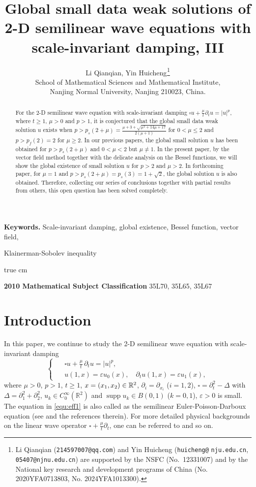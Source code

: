 \documentclass[11pt,twoside]{article}
\title{Global small data weak solutions of 2-D semilinear wave equations
with  scale-invariant  damping, III}
\author{Li Qianqian, \qquad Yin Huicheng$^{}$\footnote{Li Qianqian (\texttt{214597007@qq.com}) and Yin Huicheng
    (\texttt{huicheng@} \texttt{nju.edu.cn}, \texttt{05407@njnu.edu.cn}) are supported by the NSFC
    (No.~12331007) and by the National key research and development programs of China (No. 2020YFA0713803, No. 2024YFA1013300).}\vspace{0.5cm}\\
  \small School of Mathematical Sciences and Mathematical Institute,\\
\small Nanjing Normal University, Nanjing 210023, China.\\}
\newcommand{\R}{\mathbb R}
\newcommand{\p}{\partial}
\newcommand{\ve}{\varepsilon}
\newcommand{\f}{\frac}
\theoremstyle{plain}
\theoremstyle{definition}
\theoremstyle{remark}
\numberwithin{equation}{section}
\begin{document}
\date{}

\maketitle
\thispagestyle{empty}

\begin{abstract}
For the $2$-D semilinear wave equation with  scale-invariant  damping
$\square u+\f{\mu}{t}\p_tu=|u|^p$,
where $t\ge 1$, $\mu>0$ and $p>1$,  it is conjectured that  the
global small data weak solution $u$ exists when $p>p_{s}(2+\mu)
=\f{\mu+3+\sqrt{\mu^2+14\mu+17}}{2(\mu+1)}$ for  $0<\mu\le 2$ and $p>p_f(2)=2$ for $\mu\ge 2$. In our previous papers,
the global small solution $u$ has been obtained for $p>p_{s}(2+\mu)$
and $0<\mu<2$ but $\mu\not=1$. In the present paper, by the vector field method
together with the delicate analysis on the Bessel functions, we will show the global existence of small solution $u$ for
$p>2$ and $\mu>2$. In forthcoming paper, for $\mu=1$ and $p>p_{s}(2+\mu)=p_{s}(3)=1+\sqrt 2$,
the global solution $u$ is also obtained.
Therefore, collecting our series of conclusions together with partial results from others, this open question has been solved completely.
\end{abstract}

\noindent
\textbf{Keywords.} Scale-invariant damping,  global existence, Bessel function, vector field,

\qquad \quad Klainerman-Sobolev inequality

 true cm

\noindent
\textbf{2010 Mathematical Subject Classification} 35L70, 35L65, 35L67

\tableofcontents

\section{Introduction}
In this paper, we continue to study  the 2-D semilinear wave equation with scale-invariant  damping
\begin{equation}\label{equ:eff1}
\left\{ \enspace
\begin{aligned}
&\square u+\f{\mu}{t}\,\p_tu=|u|^p, \\
&u(1,x)=\ve u_0(x), \quad \partial_{t} u(1,x)=\ve u_1(x),
\end{aligned}
\right.
\end{equation}
where $\mu>0$,  $p>1$, $t\ge 1$, $x=(x_1, x_2)\in\Bbb R^2$,
$\p_i=\p_{x_i}$ ($i=1, 2$), $\square=\partial_t^2-\Delta$ with $\Delta=\p_1^2+\p_2^2$, $u_k\in
C_0^{\infty}(\R^2)$ and $\operatorname{supp} u_k\in B(0, 1)$  ($k=0, 1$), $\ve>0$ is small.
The equation in \eqref{equ:eff1} is also called as the semilinear Euler-Poisson-Darboux equation (see \cite{DA-0}
and the references therein). For  more detailed physical backgrounds on the linear wave operator $\square+\f{\mu}{t}\p_t$,
one can be referred to \cite{LWY} and so on.
\end{document}
